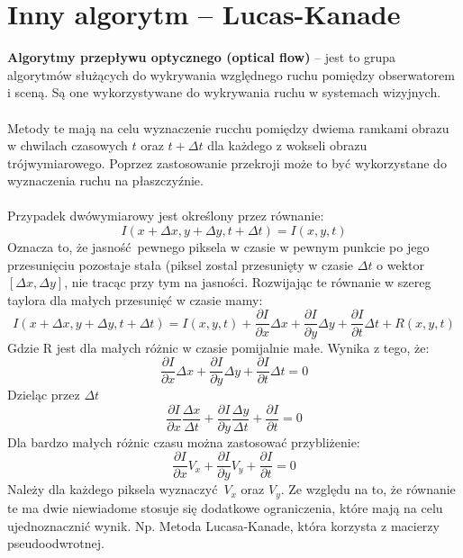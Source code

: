 \documentclass[a4paper, 12pt, titlepage]{article}
\begin{document}
    \section{Inny algorytm -- Lucas-Kanade}
        \textbf{Algorytmy przepływu optycznego (optical flow)} -- jest to grupa
        algorytmów służących do wykrywania względnego ruchu pomiędzy 
        obserwatorem i sceną. Są one wykorzystywane do wykrywania ruchu w
        systemach wizyjnych.
        \\ \\
        Metody te mają na celu wyznaczenie rucchu pomiędzy dwiema ramkami obrazu
        w chwilach czasowych $t$ oraz $t + \Delta t$ dla każdego z wokseli
        obrazu trójwymiarowego. Poprzez zastosowanie przekroji może to być 
        wykorzystane do wyznaczenia ruchu na płaszczyźnie.
        \\ \\
        Przypadek dwówymiarowy jest określony przez równanie:
        $$
            I(x + \Delta x, y + \Delta y, t + \Delta t) = I(x, y, t)
        $$
        Oznacza to, że jasność pewnego piksela w czasie w pewnym punkcie po
        jego przesunięciu pozostaje stała (piksel zostal przesunięty w czasie
        $\Delta t$ o wektor $[\Delta x, \Delta y]$, nie tracąc przy tym na
        jasności. Rozwijając te równanie w szereg taylora dla małych 
        przesunięć w czasie mamy:
        $$
            I(x + \Delta x, y + \Delta y, t + \Delta t) = I(x, y, t) +
                \frac{\partial I}{\partial x} \Delta x +
                \frac{\partial I}{\partial y} \Delta y +
                \frac{\partial I}{\partial t} \Delta t +
                R(x, y, t)
        $$
        Gdzie R jest dla małych różnic w czasie pomijalnie małe. Wynika z tego,
        że:
        $$
            \frac{\partial I}{\partial x} \Delta x +
            \frac{\partial I}{\partial y} \Delta y +
            \frac{\partial I}{\partial t} \Delta t = 0
        $$
        Dzieląc przez $\Delta t$
        $$
            \frac{\partial I}{\partial x} \frac{\Delta x}{\Delta t} +
            \frac{\partial I}{\partial y} \frac{\Delta y}{\Delta t} +
            \frac{\partial I}{\partial t} = 0
        $$
        Dla bardzo małych różnic czasu można zastosować przybliżenie:
        $$
            \frac{\partial I}{\partial x} V_x +
            \frac{\partial I}{\partial y} V_y +
            \frac{\partial I}{\partial t} = 0
        $$
        Należy dla każdego piksela wyznaczyć $V_x$ oraz $V_y$. Ze względu na to,
        że równanie te ma dwie niewiadome stosuje się dodatkowe ograniczenia, 
        które mają na celu ujednoznacznić wynik. Np. Metoda Lucasa-Kanade,
        która korzysta z macierzy pseudoodwrotnej.
\end{document}
